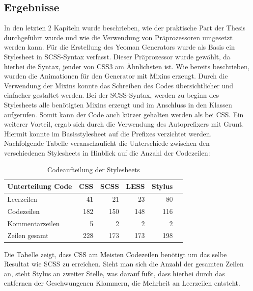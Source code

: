 \subsection{Ergebnisse}
In den letzten 2 Kapiteln wurde beschrieben, wie der praktische Part der Thesis durchgeführt wurde und wie die Verwendung von Präprozessoren umgesetzt werden kann. Für die Erstellung des Yeoman Generators wurde als Basis ein Stylesheet in SCSS-Syntax verfasst.\newline
Dieser Präprozessor wurde gewählt, da hierbei die Syntax, jender von CSS3 am Ähnlichsten ist. \newline
Wie bereits beschrieben, wurden die Animationen für den Generator mit Mixins erzeugt. Durch die Verwendung der Mixins konnte das Schreiben des Codes übersichtlicher und einfacher gestaltet werden. Bei der SCSS-Syntax, werden zu beginn des Stylesheets alle benötigten Mixins erzeugt und im Anschluss in den Klassen aufgerufen. Somit kann der Code auch kürzer gehalten werden als bei CSS. \newline
Ein weiterer Vorteil, ergab sich durch die Verwendung des Autoprefixers mit Grunt. Hiermit konnte im Basisstylesheet auf die Prefixes verzichtet werden. \newline 
Nachfolgende Tabelle veranschaulicht die Unterschiede zwischen den verschiedenen Stylesheets in Hinblick auf die Anzahl der Codezeilen:\newline
\begin{table}[h]
          \centering
          \begin{tabular}{|l|r|r|r|r|r|} \hline
                  \textbf{Unterteilung Code} & \textbf{CSS} & \textbf{SCSS} & \textbf{LESS} & \textbf{Stylus}\\
                   \hline
                    Leerzeilen & 41 & 21 & 23 & 80\\ \hline
                    Codezeilen & 182 & 150 & 148 & 116\\ \hline
                    Kommentarzeilen & 5 & 2 & 2 & 2\\ \hline
	         Zeilen gesamt & 228 & 173 & 173 & 198\\ \hline
          \end{tabular}
          \caption{
	       Codeaufteilung der Stylesheets
          }
         \label{table:Vergleich Stylesheets}
\end{table}
Die Tabelle zeigt, dass CSS am Meisten Codezeilen benötigt um das selbe Resultat wie SCSS zu erreichen. Sieht man sich die Anzahl der gesamten Zeilen an, steht Stylus an zweiter Stelle, was darauf fußt, dass hierbei durch das entfernen der Geschwungenen Klammern, die Mehrheit an Leerzeilen entsteht.\newline
